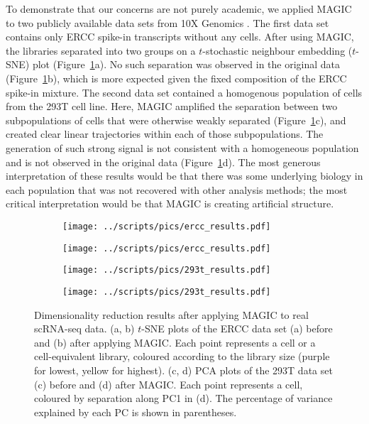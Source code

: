 \documentclass[10pt,letterpaper]{article}
\begin{document}
To demonstrate that our concerns are not purely academic, we applied MAGIC to two publicly available data sets from 10X Genomics \cite{zheng2017massively}.
The first data set contains only ERCC spike-in transcripts without any cells.
After using MAGIC, the libraries separated into two groups on a $t$-stochastic neighbour embedding ($t$-SNE) \cite{van2008visualizing} plot (Figure~\ref{fig:realdata}a).
No such separation was observed in the original data (Figure~\ref{fig:realdata}b), which is more expected given the fixed composition of the ERCC spike-in mixture.
The second data set contained a homogenous population of cells from the 293T cell line.
Here, MAGIC amplified the separation between two subpopulations of cells that were otherwise weakly separated (Figure~\ref{fig:realdata}c),
and created clear linear trajectories within each of those subpopulations.
The generation of such strong signal is not consistent with a homogeneous population and is not observed in the original data (Figure~\ref{fig:realdata}d).
The most generous interpretation of these results would be that there was some underlying biology in each population that was not recovered with other analysis methods;
the most critical interpretation would be that MAGIC is creating artificial structure.

\begin{figure}[btp]
\centering
\begin{subfigure}[b]{0.49\textwidth}
    \texttt{[image: ../scripts/pics/ercc\_results.pdf]}
    \caption{}
\end{subfigure}
\begin{subfigure}[b]{0.49\textwidth}
    \texttt{[image: ../scripts/pics/ercc\_results.pdf]}
    \caption{}
\end{subfigure}
\begin{subfigure}[b]{0.49\textwidth}
    \texttt{[image: ../scripts/pics/293t\_results.pdf]}
    \caption{}
\end{subfigure}
\begin{subfigure}[b]{0.49\textwidth}
    \texttt{[image: ../scripts/pics/293t\_results.pdf]}
    \caption{}
\end{subfigure}
\caption{Dimensionality reduction results after applying MAGIC to real scRNA-seq data.
(a, b) $t$-SNE plots of the ERCC data set (a) before and (b) after applying MAGIC.
Each point represents a cell or a cell-equivalent library, coloured according to the library size (purple for lowest, yellow for highest).
(c, d) PCA plots of the 293T data set (c) before and (d) after MAGIC.
Each point represents a cell, coloured by separation along PC1 in (d).
The percentage of variance explained by each PC is shown in parentheses.}
\label{fig:realdata}
\end{figure}
\end{document}
